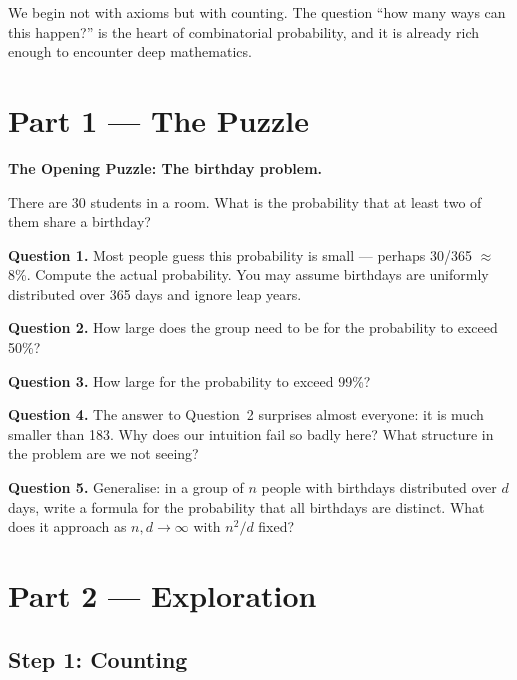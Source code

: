 \documentclass[12pt, a4paper]{article}
\newcounter{problem}
\begin{document}
\medskip
We begin not with axioms but with counting. The question ``how many ways can this happen?'' is the heart of combinatorial probability, and it is already rich enough to encounter deep mathematics.

\newpage

\section{Part 1 \texorpdfstring{---}{--} The Puzzle}

\begin{puzzlebox}
\textbf{The Opening Puzzle: The birthday problem.}

There are 30 students in a room. What is the probability that at least two of them share a birthday?

\medskip
\textbf{Question 1.} Most people guess this probability is small --- perhaps 30/365 $\approx$ 8\%. Compute the actual probability. You may assume birthdays are uniformly distributed over 365 days and ignore leap years.

\textbf{Question 2.} How large does the group need to be for the probability to exceed 50\%?

\textbf{Question 3.} How large for the probability to exceed 99\%?

\textbf{Question 4.} The answer to Question~2 surprises almost everyone: it is much smaller than 183. Why does our intuition fail so badly here? What structure in the problem are we not seeing?

\textbf{Question 5.} Generalise: in a group of $n$ people with birthdays distributed over $d$ days, write a formula for the probability that all birthdays are distinct. What does it approach as $n,d\to\infty$ with $n^2/d$ fixed?
\end{puzzlebox}

\section{Part 2 \texorpdfstring{---}{--} Exploration}

\subsection{Step 1: Counting}
\end{document}
